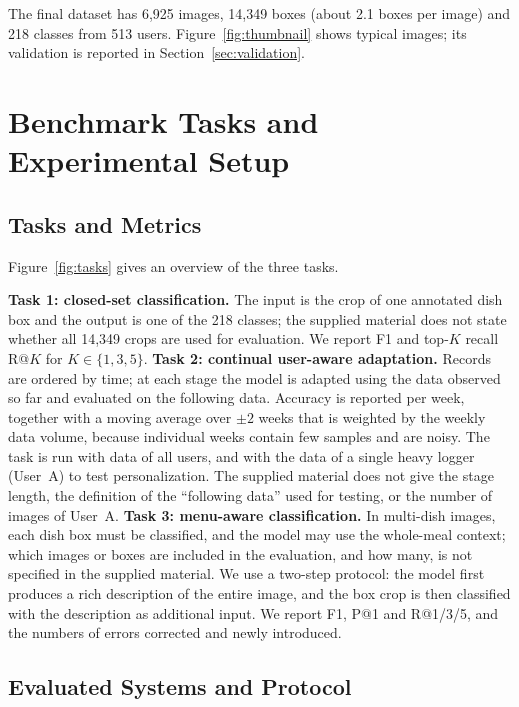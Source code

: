 \documentclass[sigconf, nonacm]{acmart}
\begin{document}
The final dataset has 6,925 images, 14,349 boxes (about 2.1 boxes per image) and 218 classes from 513 users. Figure~\ref{fig:thumbnail} shows typical images; its validation is reported in Section~\ref{sec:validation}.

\section{Benchmark Tasks and Experimental Setup}
\label{sec:setup}

\subsection{Tasks and Metrics}

Figure~\ref{fig:tasks} gives an overview of the three tasks.

\textbf{Task 1: closed-set classification.} The input is the crop of one annotated dish box and the output is one of the 218 classes; the supplied material does not state whether all 14,349 crops are used for evaluation. We report F1 and top-$K$ recall R@$K$ for $K\in\{1,3,5\}$. \textbf{Task 2: continual user-aware adaptation.} Records are ordered by time; at each stage the model is adapted using the data observed so far and evaluated on the following data. Accuracy is reported per week, together with a moving average over $\pm2$ weeks that is weighted by the weekly data volume, because individual weeks contain few samples and are noisy. The task is run with data of all users, and with the data of a single heavy logger (User~A) to test personalization. The supplied material does not give the stage length, the definition of the ``following data'' used for testing, or the number of images of User~A. \textbf{Task 3: menu-aware classification.} In multi-dish images, each dish box must be classified, and the model may use the whole-meal context; which images or boxes are included in the evaluation, and how many, is not specified in the supplied material. We use a two-step protocol: the model first produces a rich description of the entire image, and the box crop is then classified with the description as additional input. We report F1, P@1 and R@1/3/5, and the numbers of errors corrected and newly introduced.


\subsection{Evaluated Systems and Protocol}
\end{document}
